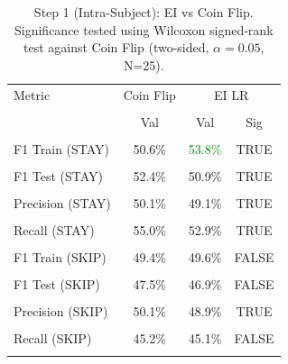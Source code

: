 \begin{table}[H]
\centering
\begin{tabular}{lccc}
\hline
Metric & Coin Flip & \multicolumn{2}{c}{EI LR} \\\\
 & Val & Val & Sig \\\\
\hline
F1 Train (STAY) & 50.6\% & \textcolor{green}{53.8\%} & TRUE \\\\
F1 Test (STAY) & 52.4\% & 50.9\% & TRUE \\\\
Precision (STAY) & 50.1\% & 49.1\% & TRUE \\\\
Recall (STAY) & 55.0\% & 52.9\% & TRUE \\\\
F1 Train (SKIP) & 49.4\% & 49.6\% & FALSE \\\\
F1 Test (SKIP) & 47.5\% & 46.9\% & FALSE \\\\
Precision (SKIP) & 50.1\% & 48.9\% & TRUE \\\\
Recall (SKIP) & 45.2\% & 45.1\% & FALSE \\\\
\hline
\end{tabular}
\caption{Step 1 (Intra-Subject): EI vs Coin Flip. Significance tested using Wilcoxon signed-rank test against Coin Flip (two-sided, $\alpha=0.05$, N=25).}
\label{tab:metrics_1_intra}
\end{table}